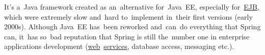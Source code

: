 \label{springframework}
It's a~Java framework created as an~alternative for~Java~EE, especially for~\hyperref[enterprisejavabeans]{EJB}, which were extremely slow and~hard to~implement in~their first versions (early 2000s). Although Java~EE has~been reworked and~can~do everything that Spring can, it~has so~bad reputation that Spring is still the~number one in enterprise applications development (\hyperref[internetweb]{web}~\hyperref[applicationprocessprogramservicethread]{services}, database access, messaging etc.).

